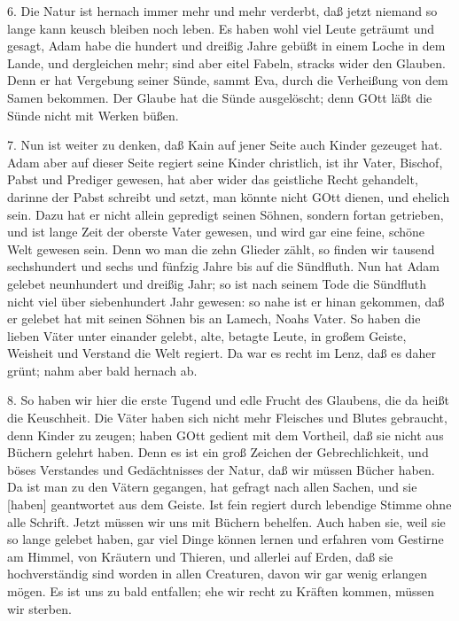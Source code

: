 6. Die Natur ist hernach immer mehr und mehr verderbt, daß jetzt niemand so lange kann keusch bleiben noch leben. Es haben wohl viel Leute geträumt und gesagt, Adam habe die hundert und dreißig Jahre gebüßt in einem Loche in dem Lande, und dergleichen mehr; sind aber eitel Fabeln, stracks wider den Glauben. Denn er hat Vergebung seiner Sünde, sammt Eva, durch die Verheißung von dem Samen bekommen. Der Glaube hat die Sünde ausgelöscht; denn GOtt läßt die Sünde nicht mit Werken büßen.

7. Nun ist weiter zu denken, daß Kain auf jener Seite auch Kinder gezeuget hat. Adam aber auf dieser Seite regiert seine Kinder christlich, ist ihr Vater, Bischof, Pabst und Prediger gewesen, hat aber wider das geistliche Recht gehandelt, darinne der Pabst schreibt und setzt, man könnte nicht GOtt dienen, und ehelich sein. Dazu hat er nicht allein gepredigt seinen Söhnen, sondern fortan getrieben, und ist lange Zeit der oberste Vater gewesen, und wird gar eine feine, schöne Welt gewesen sein. Denn wo man die zehn Glieder zählt, so finden wir tausend sechshundert und sechs und fünfzig Jahre bis auf die Sündfluth. Nun hat Adam gelebet neunhundert und dreißig Jahr; so ist nach seinem Tode die Sündfluth nicht viel über siebenhundert Jahr gewesen: so nahe ist er hinan gekommen, daß er gelebet hat mit seinen Söhnen bis an Lamech, Noahs Vater. So haben die lieben Väter unter einander gelebt, alte, betagte Leute, in großem Geiste, Weisheit und Verstand die Welt regiert. Da war es recht im Lenz, daß es daher grünt; nahm aber bald hernach ab.

8. So haben wir hier die erste Tugend und edle Frucht des Glaubens, die da heißt die Keuschheit. Die Väter haben sich nicht mehr Fleisches und Blutes gebraucht, denn Kinder zu zeugen; haben GOtt gedient mit dem Vortheil, daß sie nicht aus Büchern gelehrt haben. Denn es ist ein groß Zeichen der Gebrechlichkeit, und böses Verstandes und Gedächtnisses der Natur, daß wir müssen Bücher haben. Da ist man zu den Vätern gegangen, hat gefragt nach allen Sachen, und sie [haben] geantwortet aus dem Geiste. Ist fein regiert durch lebendige Stimme
ohne alle Schrift. Jetzt müssen wir uns mit Büchern behelfen. Auch haben sie, weil sie so lange gelebet haben, gar viel Dinge können lernen und erfahren vom Gestirne am Himmel, von Kräutern und Thieren, und allerlei auf Erden, daß sie hochverständig sind worden in allen Creaturen, davon wir gar wenig erlangen mögen. Es ist uns zu bald entfallen; ehe wir recht zu Kräften kommen, müssen wir sterben.

